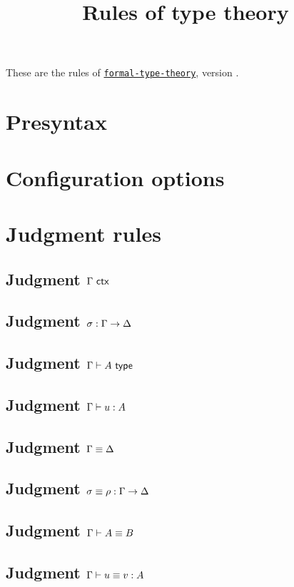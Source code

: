 \documentclass{article}
\begin{document}
\title{Rules of type theory}
\author{}
\maketitle

These are the rules of
\href{https://github.com/TheoWinterhalter/formal-type-theory}{\texttt{formal-type-theory}},
version \texttt{}.

\section{Presyntax}



\section{Configuration options}



\section{Judgment rules}

\subsection{Judgment $\Gamma\ \mathsf{ctx}$}

\isctxRules

\subsection{Judgment $\sigma : \Gamma \to \Delta$}

\issubstRules

\subsection{Judgment $\Gamma \vdash A \ \mathsf{type}$}

\istypeRules

\subsection{Judgment $\Gamma \vdash u : A$}

\istermRules

\subsection{Judgment $\Gamma \equiv \Delta$}

\eqctxRules

\subsection{Judgment $\sigma \equiv \rho : \Gamma \to \Delta$}

\eqsubstRules

\subsection{Judgment $\Gamma \vdash A \equiv B$}

\eqtypeRules

\subsection{Judgment $\Gamma \vdash u \equiv v : A$}

\eqtermRules
\end{document}
